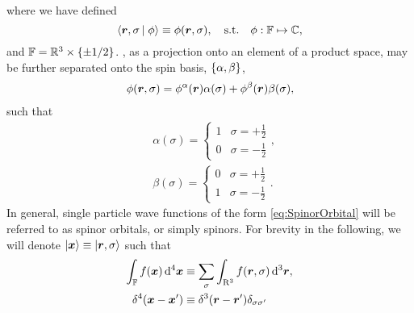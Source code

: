 where we have defined
\begin{equation}
  \label{eq:SpinorOrbital}
  \left\langle \boldsymbol{r},\sigma \left\vert\right. \phi \right\rangle \equiv \phi(\boldsymbol{r},\sigma), \quad \mathrm{s.t.} \quad \phi : \mathbb F \mapsto \mathbb C,
\end{equation}
and $\mathbb F = \mathbb R^3 \times \left \lbrace \pm1/2 \right\rbrace$. 
, as a projection onto
an element of a product space, may be further separated onto the spin basis, $\left \lbrace \alpha,\beta \right\rbrace$,
\begin{align}
  \phi(\boldsymbol{r},\sigma) = \phi^\alpha(\boldsymbol{r})\alpha(\sigma) + \phi^\beta(\boldsymbol{r})\beta(\sigma),
\end{align}
such that
\begin{align}
  &\alpha(\sigma) = \begin{cases} 1 & \sigma = +\frac{1}{2} \\ 0 & \sigma = -\frac{1}{2} \end{cases}, \\ 
  &\beta(\sigma)  = \begin{cases} 0 & \sigma = +\frac{1}{2} \\ 1 & \sigma = -\frac{1}{2} \end{cases}.
\end{align}
In general, single particle wave functions of the form \cref{eq:SpinorOrbital} will be referred to as spinor orbitals, or simply spinors.
For brevity in the following, we will denote $\left\vert \boldsymbol{x} \right\rangle \equiv \left\vert \boldsymbol{r},\sigma \right\rangle$ such that
\begin{subequations}
\begin{align}
\int_{\mathbb F} f(\boldsymbol{x}) \,\mathrm{d}^4 \boldsymbol{x} &\equiv \sum_\sigma \int_{\mathrm{R}^3} f(\boldsymbol{r},\sigma) \,\mathrm{d}^3 \boldsymbol{r},\\
\delta^4(\boldsymbol{x} - \boldsymbol{x}') &\equiv \delta^3(\boldsymbol{r} - \boldsymbol{r}')\delta_{\sigma\sigma'}
\end{align}
\end{subequations}

